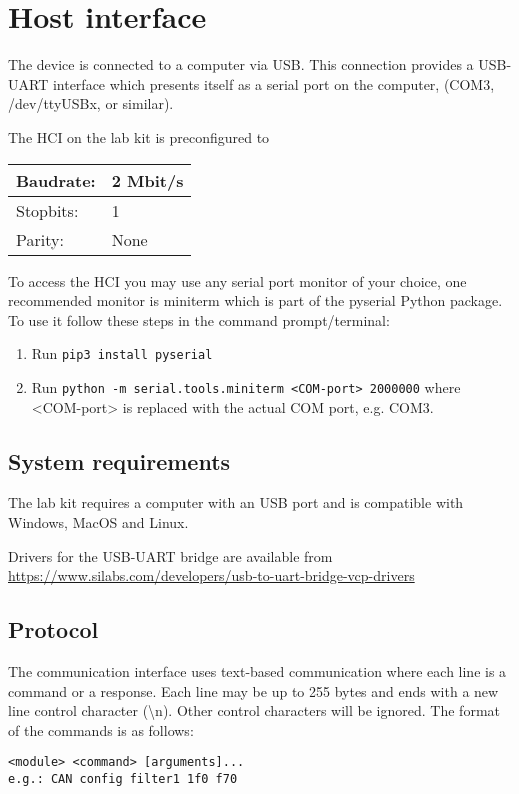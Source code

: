 \documentclass{article}[a4paper]
\begin{document}
\section{Host interface}

The device is connected to a computer via USB. This connection provides a
USB-UART interface which presents itself as a serial port on the computer,
(COM3, /dev/ttyUSBx, or similar).

The HCI on the lab kit is preconfigured to

\medskip
\noindent
\begin{tabularx}{\textwidth}{|p{3cm}|X|}
\hline
Baudrate: & 2 Mbit/s \\
\hline
Stopbits: & 1 \\
\hline
Parity: & None \\
\hline
\end{tabularx}

To access the HCI you may use any serial port monitor of your choice, one
recommended monitor is miniterm which is part of the pyserial Python package. To
use it follow these steps in the command prompt/terminal:

\begin{enumerate}
\item Run \texttt{pip3 install pyserial}
\item Run \texttt{python -m serial.tools.miniterm <COM-port> 2000000} where
      <COM-port> is replaced with the actual COM port, e.g. COM3.
\end{enumerate}

\subsection{System requirements}

The lab kit requires a computer with an USB port and is compatible with Windows,
MacOS and Linux.

Drivers for the USB-UART bridge are available from
\url{https://www.silabs.com/developers/usb-to-uart-bridge-vcp-drivers}

\subsection{Protocol}

The communication interface uses text-based communication where each line is a
command or a response. Each line may be up to 255 bytes and ends with a new
line control character
(\textbackslash n). Other control characters will be ignored. The format of
the commands is as follows:
\begin{verbatim}
<module> <command> [arguments]...
e.g.: CAN config filter1 1f0 f70
\end{verbatim}
\end{document}

